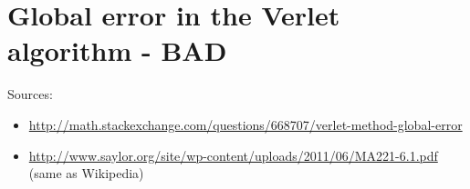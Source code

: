 
\section{Global error in the Verlet algorithm - BAD}
Sources:
\begin{itemize}
    \item \url{http://math.stackexchange.com/questions/668707/verlet-method-global-error}
    \item \url{http://www.saylor.org/site/wp-content/uploads/2011/06/MA221-6.1.pdf} (same as Wikipedia)
\end{itemize}

